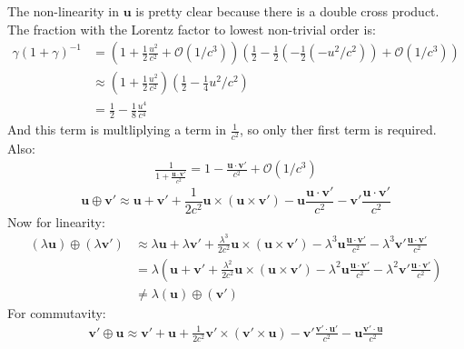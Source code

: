 \documentclass[12pt,a4]{article}
\begin{document}
\begin{enumerate}
\begin{enumerate}
        The non-linearity in $\mathbf{u}$ is pretty clear because there is a double cross product.
        The fraction with the Lorentz factor to lowest non-trivial order is:
        \begin{align*}
          \gamma (1 + \gamma)^{-1} &= \left(1 +\frac{1}{2}\frac{u^2}{c^2} + \mathcal{O}(1/c^3)\right)\left(\frac{1}{2} - \frac{1}{2}(-\frac{1}{2}(-u^2/c^2))+ \mathcal{O}(1/c^3)\right)\\
                                &\approx \left(1 +\frac{1}{2}\frac{u^2}{c^2}\right)\left(\frac{1}{2} - \frac{1}{4}u^2/c^2\right)\\
                                &= \frac{1}{2} -\frac{1}{8}\frac{u^4}{c^4}
        \end{align*}
        And this term is multliplying a term in $\frac{1}{c^2}$, so only ther first term is required.
        Also:
        \begin{align*}
          \frac{1}{1 + \frac{\mathbf{u}\cdot\mathbf{v'}}{c^2}} = 1 - \frac{\mathbf{u} \cdot \mathbf{v'}}{c^2} + \mathcal{O}(1/c^3)
        \end{align*}
        \begin{equation*}
          \mathbf{u}\oplus \mathbf{v'} \approx \mathbf{u} + \mathbf{v}' + \frac{1}{2c^2}\mathbf{u}\times(\mathbf{u} \times \mathbf{v}') - \mathbf{u}\frac{\mathbf{u}\cdot\mathbf{v}'}{c^2} - \mathbf{v}'\frac{\mathbf{u}\cdot\mathbf{v}'}{c^2}
        \end{equation*}
        Now for linearity:
        \begin{align*}
          (\lambda \mathbf{u})\oplus (\lambda \mathbf{v'}) &\approx \lambda\mathbf{u} + \lambda \mathbf{v}' + \frac{\lambda^3}{2c^2}\mathbf{u}\times(\mathbf{u} \times \mathbf{v}') - \lambda^3\mathbf{u}\frac{\mathbf{u}\cdot\mathbf{v}'}{c^2} - \lambda^3\mathbf{v}'\frac{\mathbf{u}\cdot\mathbf{v}'}{c^2}\\
                                                           &=      \lambda\left(\mathbf{u} + \mathbf{v}' + \frac{\lambda^2}{2c^2}\mathbf{u}\times(\mathbf{u} \times \mathbf{v}') - \lambda^2\mathbf{u}\frac{\mathbf{u}\cdot\mathbf{v}'}{c^2} - \lambda^2\mathbf{v}'\frac{\mathbf{u}\cdot\mathbf{v}'}{c^2}\right)\\
                                                           &\neq \lambda(\mathbf{u})\oplus ( \mathbf{v'})
        \end{align*}
        For commutavity:
      \begin{align*}
          \mathbf{v'}\oplus \mathbf{u} \approx \mathbf{v}' + \mathbf{u} + \frac{1}{2c^2}\mathbf{v'}\times(\mathbf{v'} \times \mathbf{u}) - \mathbf{v}'\frac{\mathbf{v'}\cdot\mathbf{u}'}{c^2} - \mathbf{u}\frac{\mathbf{v'}\cdot\mathbf{u}}{c^2}

\end{align*}
\end{enumerate}
\end{enumerate}
\end{document}
